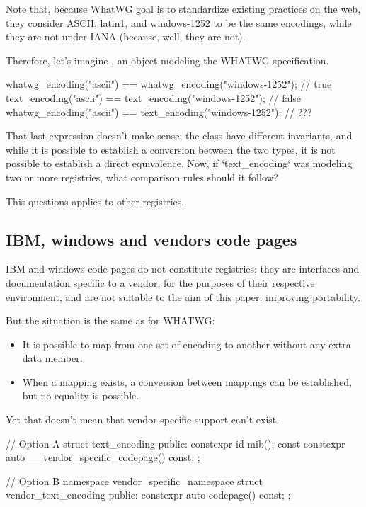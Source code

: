 \documentclass{wg21}
\begin{document}
Note that, because WhatWG goal is to standardize existing practices on the web, they consider ASCII, latin1, and windows-1252
to be the same encodings, while they are not under IANA (because, well, they are not).

Therefore, let's imagine , an object modeling the WHATWG specification.

\begin{colorblock}
whatwg_encoding("ascii") == whatwg_encoding("windows-1252");  // true
text_encoding("ascii")   == text_encoding("windows-1252");  // false
whatwg_encoding("ascii") == text_encoding("windows-1252");  // ???
\end{colorblock}

That last expression doesn't make sense; the class have different invariants, and while it is possible to establish
a conversion between the two types, it is not possible to establish a direct equivalence.
Now, if `text_encoding` was modeling two or more registries, what comparison rules should it follow?


This questions applies to other registries.

\subsection{IBM, windows and vendors code pages}

IBM and windows code pages do not constitute registries; they are interfaces and documentation specific to a vendor, for the purposes of their respective environment, and are not suitable to the aim of this paper: improving portability.

But the situation is the same as for WHATWG:
\begin{itemize}
\item It is possible to map from one set of encoding to another without any extra data member.
\item When a mapping exists, a conversion between mappings can be established, but no equality is possible.
\end{itemize}

Yet that doesn't mean that vendor-specific support can't exist.

\begin{colorblock}
// Option A
struct text_encoding  {
public:
    constexpr id mib(); const
    constexpr auto __vendor_specific_codepage() const;
};

// Option B
namespace vendor_specific_namespace{
    struct vendor_text_encoding  {
        public:
        constexpr auto codepage() const;
    };
}
\end{colorblock}
\end{document}
